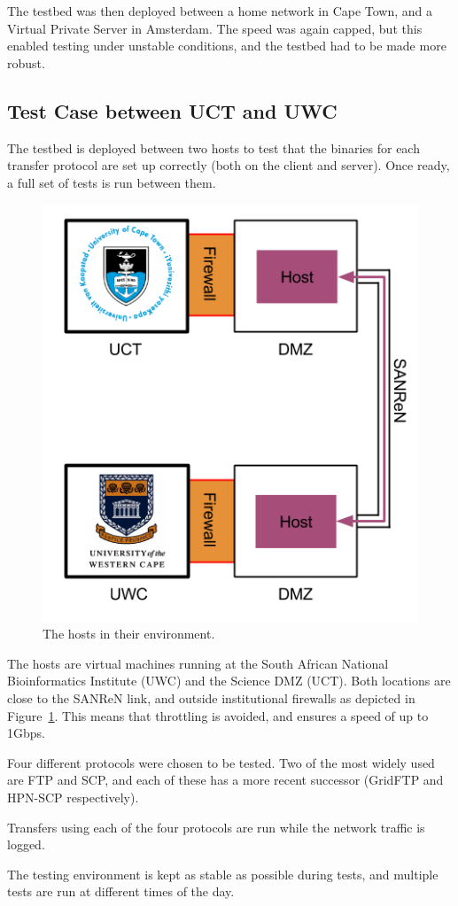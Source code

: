 \documentclass{sig-alternate-05-2015}
\begin{document}
The testbed was then deployed between a home network in Cape Town, and a Virtual Private Server in Amsterdam. The speed was again capped, but this enabled testing under unstable conditions, and the testbed had to be made more robust.

\subsection{Test Case between UCT and UWC}
The testbed is deployed between two hosts to test that the binaries for each transfer protocol are set up correctly (both on the client and server). Once ready, a full set of tests is run between them.

\begin{figure}[t]
\centering
	\includegraphics[width=.6\linewidth]{img/route.png}
\caption{The hosts in their environment.\label{fig:route}}
\end{figure}

The hosts are virtual machines running at the South African National Bioinformatics Institute (UWC) and the Science DMZ (UCT). Both locations are close to the SANReN link, and outside institutional firewalls as depicted in Figure~\ref{fig:route}. This means that throttling is avoided, and ensures a speed of up to 1Gbps.

Four different protocols were chosen to be tested. Two of the most widely used are FTP and SCP, and each of these has a more recent successor (GridFTP and HPN-SCP respectively).

Transfers using each of the four protocols are run while the network traffic is logged.

The testing environment is kept as stable as possible during tests, and multiple tests are run at different times of the day.
\end{document}
